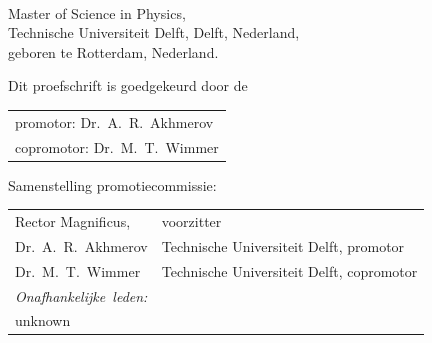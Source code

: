 \begin{titlepage}
\begin{center}
\makeatletter
{\Large\titlefont\bfseries\@firstname\ {\titleshape\@lastname}}
\makeatother

\bigskip
\bigskip

Master of Science in Physics, \\
Technische Universiteit Delft, Delft, Nederland, \\
geboren te Rotterdam, Nederland.

\vspace*{2\bigskipamount}

\end{center}

\clearpage
\thispagestyle{empty}

\noindent Dit proefschrift is goedgekeurd door de

\medskip\noindent
\begin{tabular}{l}
    promotor:  Dr.\ A.\ R.\ Akhmerov \\
    copromotor: Dr.\ M.\ T.\ Wimmer
\end{tabular}

\bigskip
\noindent Samenstelling promotiecommissie:

\medskip\noindent
\begin{tabular}{p{4cm}l}
    Rector Magnificus, & voorzitter \\
    Dr.\ A.\ R.\ Akhmerov & Technische Universiteit Delft, promotor \\
    Dr.\ M.\ T.\ Wimmer & Technische Universiteit Delft, copromotor \\

    \medskip
    \mbox{\emph{Onafhankelijke leden:}} & \\
    unknown



\end{tabular}
\end{titlepage}
